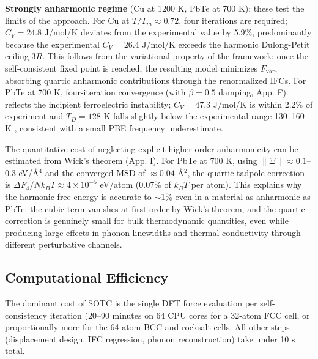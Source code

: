 \documentclass[aps,prb,reprint,amsmath,amssymb,floatfix]{revtex4-2}
\begin{document}
\textbf{Strongly anharmonic regime} (Cu at 1200 K, PbTe at 700 K): these
test the limits of the approach. For Cu at \(T/T_m \approx 0.72\), four
iterations are required; \(C_V = 24.8\) J/mol/K deviates from the
experimental value by 5.9\%, predominantly because the experimental
$C_V = 26.4$ J/mol/K exceeds the harmonic Dulong-Petit ceiling $3R$.
This follows from the variational property of the framework: once the
self-consistent fixed point is reached, the resulting model minimizes
$F_\text{var}$, absorbing quartic anharmonic contributions through the
renormalized IFCs. For PbTe at 700 K, four-iteration convergence (with
\(\beta = 0.5\) damping, App. F) reflects the incipient ferroelectric
instability; \(C_V = 47.3\) J/mol/K is within 2.2\% of experiment and
\(T_D = 128\) K falls slightly below the experimental range 130--160 K
\cite{ref31,ref32}, consistent with a small PBE frequency
underestimate.

The quantitative cost of neglecting explicit higher-order anharmonicity
can be estimated from Wick's theorem (App. I). For PbTe at 700 K, using
\(\|\Xi\| \approx 0.1\)--0.3 eV/Å\(^4\) \cite{ref31} and the converged
MSD of \(\approx 0.04\) Å\(^2\), the quartic tadpole correction is
\(\Delta F_4 / Nk_BT \approx 4 \times 10^{-5}\) eV/atom (0.07\% of
\(k_BT\) per atom). This explains why the harmonic free energy is
accurate to $\sim$1\% even in a material as anharmonic as PbTe: the
cubic term vanishes at first order by Wick's theorem, and the quartic
correction is genuinely small for bulk thermodynamic quantities, even
while producing large effects in phonon linewidths and thermal
conductivity through different perturbative channels.

\subsection{Computational Efficiency}\label{computational-efficiency}

The dominant cost of SOTC is the single DFT force evaluation per
self-consistency iteration (20--90 minutes on 64 CPU cores for a
32-atom FCC cell, or proportionally more for the 64-atom BCC and
rocksalt cells. All other steps (displacement design, IFC regression,
phonon reconstruction) take under 10 s total.
\end{document}
